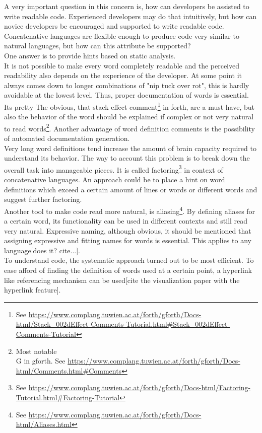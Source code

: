 A very important question in this concern is, how can developers be assisted to write readable code. Experienced developers may do that intuitively, but how can novice developers be encouraged and supported to write readable code. Concatenative languages are flexible enough to produce code very similar to natural languages, but how can this attribute be supported?\\
One answer is to provide hints based on static analysis.\\
It is not possible to make every word completely readable and the perceived readability also depends on the experience of the developer. At some point  it always comes down to longer combinations of "nip tuck over rot", this is hardly avoidable at the lowest level. Thus, proper documentation of words is essential. Its pretty The obvious, that stack effect comment\footnote{See \url{https://www.complang.tuwien.ac.at/forth/gforth/Docs-html/Stack\_002dEffect-Comments-Tutorial.html\#Stack\_002dEffect-Comments-Tutorial}} in forth, are a must have, but also the behavior of the word should be explained if complex or not very natural to read words\footnote{Most notable \\G in gforth. See \url{https://www.complang.tuwien.ac.at/forth/gforth/Docs-html/Comments.html\#Comments}}. Another advantage of word definition comments is the possibility of automated documentation generation.\\
Very long word definitions tend increase the amount of brain capacity required to understand its behavior. The way to account this problem is to break down the overall task into manageable pieces. It is called factoring\footnote{See \url{https://www.complang.tuwien.ac.at/forth/gforth/Docs-html/Factoring-Tutorial.html\#Factoring-Tutorial}} in context of concatenative languages. An approach could be to place a hint on word definitions which exceed a certain amount of lines or words or different words and suggest further factoring.\\
Another tool to make code read more natural, is aliasing\footnote{See \url{https://www.complang.tuwien.ac.at/forth/gforth/Docs-html/Aliases.html}}. By defining aliases for a certain word, its functionality can be used in different contexts and still read very natural.
Expressive naming, although obvious, it should be mentioned that assigning expressive and fitting names for words is essential. This applies to any language[does it? cite...].\\
To understand code, the systematic approach turned out to be most efficient\cite{Robillard:2004:EDI:1042203.1042417}. To ease afford of finding the definition of words used at a certain point, a hyperlink like referencing mechanism can be used[cite the visualization paper with the hyperlink feature].\\
